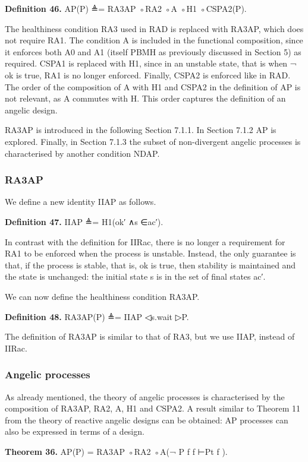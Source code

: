\documentclass[11pt]{article}
\begin{document}
\noindent\textbf{Definition 46.} AP(P) ≜= RA3AP ◦RA2 ◦A ◦H1 ◦CSPA2(P).


The healthiness condition RA3 used in RAD is replaced with RA3AP, which does not require RA1. The condition A is included in the functional composition, since it enforces both A0 and A1 (itself PBMH as previously discussed in Section 5) as required. CSPA1 is replaced with H1, since in an unstable state, that is when ¬ ok is true, RA1 is no longer enforced. Finally, CSPA2 is enforced like in RAD. The order of the composition of A with H1 and CSPA2 in the definition of AP is not relevant, as A commutes with H. This order captures the definition of an angelic design.

RA3AP is introduced in the following Section 7.1.1. In Section 7.1.2 AP is explored. Finally, in Section 7.1.3 the subset of non-divergent angelic processes is characterised by another condition NDAP.

\subsubsection{RA3AP}
We define a new identity IIAP as follows.

\noindent\textbf{Definition 47.} IIAP ≜= H1(ok′ ∧s ∈ac′).


In contrast with the definition for IIRac, there is no longer a requirement for RA1 to be enforced when the process is unstable. Instead, the only guarantee is that, if the process is stable, that is, ok is true, then stability is maintained and the state is unchanged: the initial state s is in the set of final states ac′.

We can now define the healthiness condition RA3AP.

\noindent\textbf{Definition 48.} RA3AP(P) ≜= IIAP ◁s.wait ▷P.


The definition of RA3AP is similar to that of RA3, but we use IIAP, instead of IIRac.

\subsubsection{Angelic processes}
As already mentioned, the theory of angelic processes is characterised by the composition of RA3AP, RA2, A, H1 and CSPA2. A result similar to Theorem 11 from the theory of reactive angelic designs can be obtained: AP processes can also be expressed in terms of a design.

\noindent\textbf{Theorem 36.} AP(P) = RA3AP ◦RA2 ◦A(¬ P f f ⊢Pt f ).
\end{document}
